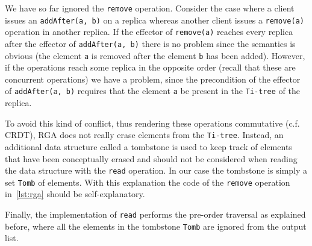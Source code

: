 
We have so far ignored the \lstinline|remove| operation.
%
Consider the case where a client issues an \lstinline|addAfter(a, b)|
on a replica whereas another client issues a \lstinline|remove(a)|
operation in another replica.
%
If the effector of \lstinline|remove(a)| reaches every replica after
the effector of \lstinline|addAfter(a, b)| there is no problem since
the semantics is obvious (the element \lstinline|a| is removed after
the element \lstinline|b| has been added).
%
However, if the operations reach some replica in the opposite order
(recall that these are concurrent operations) we have a problem, since
the precondition of the effector of \lstinline|addAfter(a, b)|
requires that the element \lstinline|a| be present in the
\lstinline|Ti-tree| of the replica.

To avoid this kind of conflict, thus rendering these operations
commutative (c.f. CRDT), RGA does not really erase elements from the
\lstinline|Ti-tree|.
%
Instead, an additional data structure called a tombstone is used to
keep track of elements that have been conceptually erased and should
not be considered when reading the data structure with the
\lstinline|read| operation.
%
In our case the tombstone is simply a set \lstinline|Tomb| of
elements.
%
With this explanation the code of the \lstinline|remove| operation
in~\autoref{lst:rga} should be self-explanatory.

Finally, the implementation of \lstinline|read| performs the pre-order
traversal as explained before, where all the elements in the tombstone
\lstinline|Tomb| are ignored from the output list.




